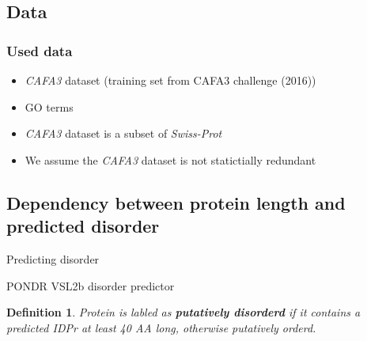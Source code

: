 \documentclass{beamer}
\newcommand{\keyword}[1]{\textbf{#1}}
\newcommand{\swissprot}{\textit{Swiss-Prot} }
\newtheorem{definicija}{Definition}
\begin{document}
\subsection{Data}
\begin{frame}
  \frametitle{Used data}

  \begin{itemize}
    \item \textit{CAFA3} dataset (training set from CAFA3 challenge (2016))
      \pause
    \item GO terms
      \pause
    \item \textit{CAFA3} dataset is a subset of \swissprot
      \pause
    \item We assume the \textit{CAFA3} dataset is not statictially redundant
  \end{itemize}

\end{frame}




\subsection{Dependency between protein length and predicted disorder }

\begin{frame}{Predicting disorder}

  PONDR VSL2b disorder predictor
  \pause

  \begin{definicija}
    \label{pdis_def}
    Protein is labled as \keyword{putatively disorderd} if it contains a
    predicted IDPr at least 40 AA long, otherwise putatively orderd.
  \end{definicija}

\end{frame}
\end{document}
